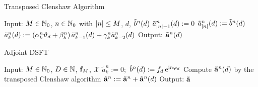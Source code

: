 \begin{algorithm}[htb]
  \caption{Transposed Clenshaw Algorithm}
  \label{NFSFT:transposedClenshaw}    
  \begin{algorithmic}
    \STATE  Input: $M \in \mathbb{N}_{0}$, $n \in \mathbb{N}_{0}$ with $\left\vert n\right\vert \le M$, $d$, $\tilde{b}^n{\hspace{-0.4ex}}\left(d\right)$
    \STATE
    \STATE $\tilde{a}_{\left\vert n\right\vert-1}^n{\hspace{-0.4ex}}\left(d\right) := 0$
    \STATE $\tilde{a}_{\left\vert n\right\vert}^n{\hspace{-0.4ex}}\left(d\right) := \tilde{b}^n{\hspace{-0.4ex}}\left(d\right)$
      \STATE $\tilde{a}_{k}^n{\hspace{-0.4ex}}\left(d\right) := \left(\alpha_{k}^n\vartheta_{d} + \beta_{k}^n\right)\tilde{a}_{k-1}^n{\hspace{-0.4ex}}\left(d\right) + \gamma_{k}^n \tilde{a}_{k-2}^n{\hspace{-0.4ex}}\left(d\right)$
    \ENDFOR
    \STATE
    \STATE Output: $\mathbf{\tilde{a}}^n{\hspace{-0.4ex}}\left(d\right)$
\end{algorithmic}
\end{algorithm}
\begin{algorithm}[htb]
  \caption{Adjoint DSFT}
  \label{NFSFT:adjointDSFT}    
  \begin{algorithmic}
    \STATE  Input: $M \in \mathbb{N}_{0}$, $D \in \mathbb{N}$, $\mathbf{f}_{M}$, $\mathcal{X}$
    \STATE
        \STATE $\tilde{a}_{k}^n := 0;$
      \ENDFOR
    \ENDFOR
        \STATE $\tilde{b}^n{\hspace{-0.4ex}}\left(d\right) := f_{d} \: \mbox{\rm{e}}^{\mbox{\scriptsize\rm{i}} n \varphi_{d}}$
        \STATE Compute $\mathbf{\tilde{a}}^n{\hspace{-0.4ex}}\left(d\right)$ by the transposed Clenshaw algorithm
        \STATE $\mathbf{\tilde{a}}^n := \mathbf{\tilde{a}}^n + \mathbf{\tilde{a}}^n{\hspace{-0.4ex}}\left(d\right)$
      \ENDFOR
    \ENDFOR
    \STATE
    \STATE Output: $\mathbf{\tilde{a}}$
\end{algorithmic}
\end{algorithm}

